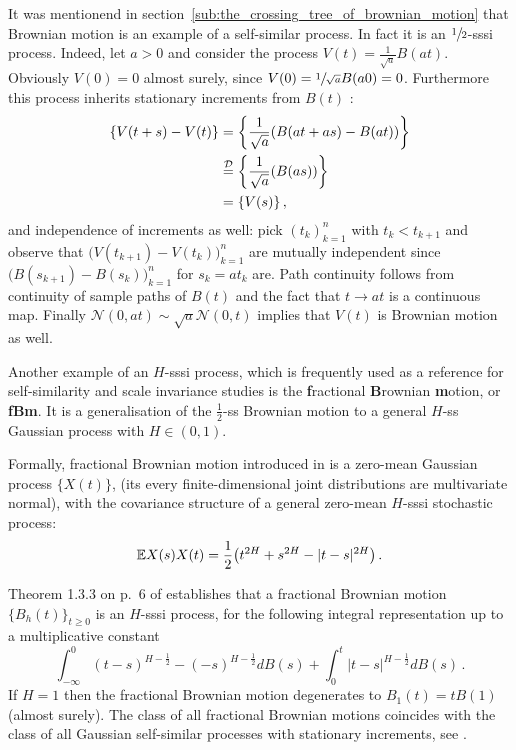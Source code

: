 It was mentionend in section~\ref{sub:the_crossing_tree_of_brownian_motion} that Brownian
motion is an example of a self-similar process. In fact it is an $\sfrac{1}{2}$-sssi process.
Indeed, let $a>0$ and consider the process $V(t) = \frac{1}{\sqrt{a}} B(at)$. Obviously
$V(0) = 0$ almost surely, since $V(0) = \sfrac{1}{\sqrt{a}} B(a 0) = 0$. Furthermore
this process inherits stationary increments from $B(t)$ : \begin{align*}
	\{ V(t+s) - V(t) \} &= \biggl\{ \frac{1}{\sqrt{a}}( B(at+as) - B(at) ) \biggr\}\\
	&\overset{\mathcal{D}}{=} \biggl\{ \frac{1}{\sqrt{a}}( B(as) ) \biggr\} \\
	&= \{ V(s) \} \,,
\end{align*}
and independence of increments as well: pick $(t_k)_{k=1}^n$ with $t_k<t_{k+1}$ and
observe that $\bigl(V(t_{k+1}) - V(t_k)\bigr)_{k=1}^n$ are mutually independent since
$\bigl(B(s_{k+1}) - B(s_k)\bigr)_{k=1}^n$ for $s_k = a t_k$ are. Path continuity follows
from continuity of sample paths of $B(t)$ and the fact that $t\to a t$ is a continuous
map.  Finally $\mathcal{N}(0, at) \sim \sqrt{a} \mathcal{N}(0,t)$ implies that $V(t)$
is Brownian motion as well.

Another example of an $H$-sssi process, which is frequently used as a reference for
self-similarity and scale invariance studies is the \textbf{f}ractional \textbf{B}rownian
\textbf{m}otion, or \textbf{fBm}. It is a generalisation of the $\tfrac{1}{2}$-ss
Brownian motion to a general $H$-ss Gaussian process with $H\in (0, 1)$.

Formally, fractional Brownian motion introduced in \cite{doi:10.1137/1010093} is a
zero-mean Gaussian process $\bigl\{X(t)\bigr\}$, (its every finite-dimensional joint
distributions are multivariate normal), with the covariance structure of a general
zero-mean $H$-sssi stochastic process:
\[ \mathbb{E} X(s) X(t) = \frac{1}{2} \bigl(t^{2H} + s^{2H} - |t-s|^{2H}\bigr) \,. \]

Theorem 1.3.3 on p.~6 of \cite{embrechtsselfsimilar} establishes that a fractional
Brownian motion $\{B_h(t)\}_{t\geq 0}$ is an $H$-sssi process, for the following
integral representation up to a multiplicative constant
\[
\int_{-\infty}^0 (t-s)^{H-\tfrac{1}{2}} - (-s)^{H-\tfrac{1}{2}} dB(s)
+ \int_0^t |t-s|^{H-\tfrac{1}{2}} dB(s) \,.
\]
If $H = 1$ then the fractional Brownian motion degenerates to $B_1(t) = tB(1)$ (almost
surely). The class of all fractional Brownian motions coincides with the class of all
Gaussian self-similar processes with stationary increments, see \cite{embrechtsselfsimilar}. 

